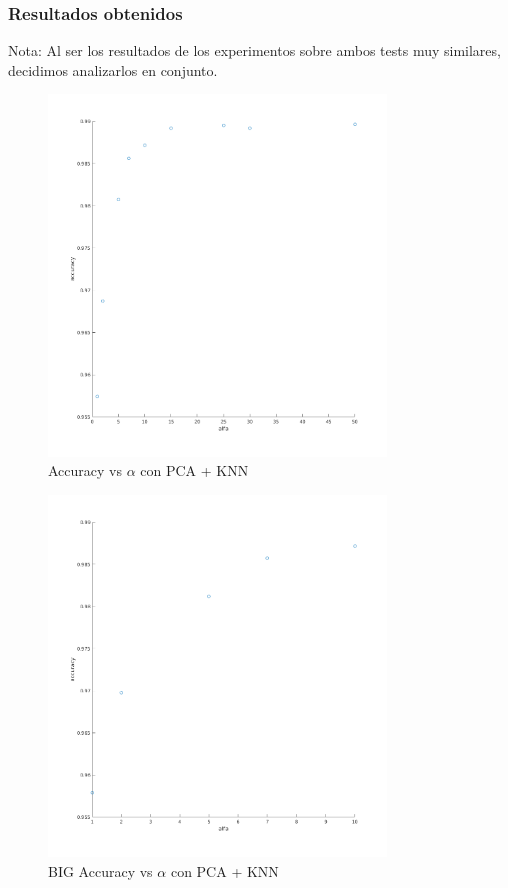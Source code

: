 \subsubsection*{Resultados obtenidos}
Nota: Al ser los resultados de los experimentos sobre ambos tests muy similares, decidimos analizarlos en conjunto.



\begin{figure}[H]
	\centering	\includegraphics[width=0.8\textwidth]{img/alfa_pca_accu.png}
	\caption{Accuracy vs $\alpha$ con PCA + KNN}
	\label{fig:Accuracy vs Alpha con KNN + PCA}
\end{figure}

\begin{figure}[H]
	\centering	\includegraphics[width=0.8\textwidth]{img/big_alfa_pca_accu.png}
	\caption{BIG Accuracy vs $\alpha$ con PCA + KNN}
	\label{fig: BIG Accuracy vs Alpha con KNN + PCA}
\end{figure}

